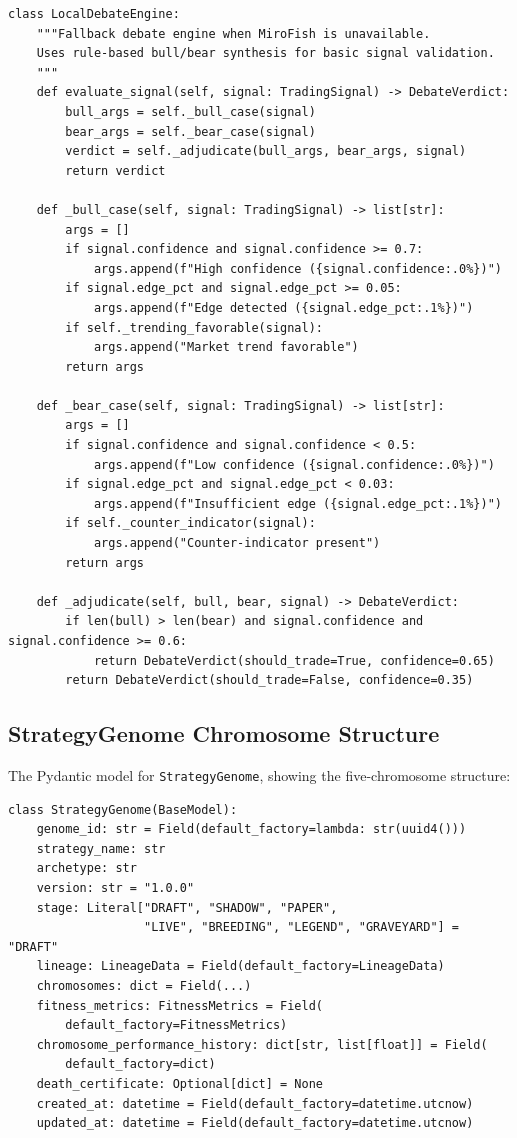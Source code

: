\documentclass[11pt]{article}
\begin{document}
\begin{lstlisting}[caption={Local debate fallback (services/mirofish\_service.py, adapted)}]
class LocalDebateEngine:
    """Fallback debate engine when MiroFish is unavailable.
    Uses rule-based bull/bear synthesis for basic signal validation.
    """
    def evaluate_signal(self, signal: TradingSignal) -> DebateVerdict:
        bull_args = self._bull_case(signal)
        bear_args = self._bear_case(signal)
        verdict = self._adjudicate(bull_args, bear_args, signal)
        return verdict

    def _bull_case(self, signal: TradingSignal) -> list[str]:
        args = []
        if signal.confidence and signal.confidence >= 0.7:
            args.append(f"High confidence ({signal.confidence:.0%})")
        if signal.edge_pct and signal.edge_pct >= 0.05:
            args.append(f"Edge detected ({signal.edge_pct:.1%})")
        if self._trending_favorable(signal):
            args.append("Market trend favorable")
        return args

    def _bear_case(self, signal: TradingSignal) -> list[str]:
        args = []
        if signal.confidence and signal.confidence < 0.5:
            args.append(f"Low confidence ({signal.confidence:.0%})")
        if signal.edge_pct and signal.edge_pct < 0.03:
            args.append(f"Insufficient edge ({signal.edge_pct:.1%})")
        if self._counter_indicator(signal):
            args.append("Counter-indicator present")
        return args

    def _adjudicate(self, bull, bear, signal) -> DebateVerdict:
        if len(bull) > len(bear) and signal.confidence and signal.confidence >= 0.6:
            return DebateVerdict(should_trade=True, confidence=0.65)
        return DebateVerdict(should_trade=False, confidence=0.35)
\end{lstlisting}

\subsection{StrategyGenome Chromosome Structure}

The Pydantic model for \texttt{StrategyGenome}, showing the five-chromosome structure:

\begin{lstlisting}[caption={StrategyGenome Pydantic model (domain/genome/models.py)}]
class StrategyGenome(BaseModel):
    genome_id: str = Field(default_factory=lambda: str(uuid4()))
    strategy_name: str
    archetype: str
    version: str = "1.0.0"
    stage: Literal["DRAFT", "SHADOW", "PAPER",
                   "LIVE", "BREEDING", "LEGEND", "GRAVEYARD"] = "DRAFT"
    lineage: LineageData = Field(default_factory=LineageData)
    chromosomes: dict = Field(...)
    fitness_metrics: FitnessMetrics = Field(
        default_factory=FitnessMetrics)
    chromosome_performance_history: dict[str, list[float]] = Field(
        default_factory=dict)
    death_certificate: Optional[dict] = None
    created_at: datetime = Field(default_factory=datetime.utcnow)
    updated_at: datetime = Field(default_factory=datetime.utcnow)
\end{lstlisting}
\end{document}
